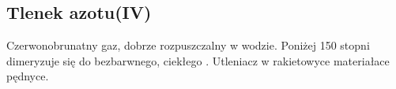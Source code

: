 \subsection{Tlenek azotu(IV) }
Czerwonobrunatny gaz, dobrze rozpuszczalny w wodzie.
Poniżej 150 stopni dimeryzuje się do bezbarwnego, ciekłego .
Utleniacz w rakietowyce materiałace pędnyce.
